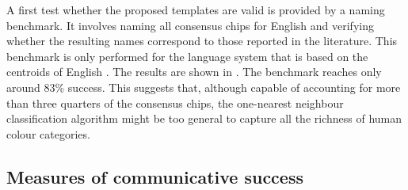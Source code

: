 A first test whether the proposed templates are valid is provided by a
naming benchmark. It
involves naming all consensus chips for English
\citep{sturges95location} and verifying whether the resulting names
correspond to those reported in the literature. This benchmark is only
performed for the language system that is based on the centroids of
English \citep{sturges95location}. The results are shown in . The benchmark reaches only around 83\%
success.  This suggests that, although capable of accounting for more
than three quarters of the consensus chips, the one-nearest neighbour
classification algorithm might be too general to capture all the
richness of human colour categories.

\begin{table}[htbp]
  \centering
  \normalsize
  \caption[Naming benchmark for English basic colour categories]{Number of correctly
    named consensus samples broken down by category: white (\textsc{we}), grey
    (\textsc{gy}), black (\textsc{bk}), green (\textsc{gn}), yellow (\textsc{yw}), blue (\textsc{bl}), red (\textsc{rd}), purple (\textsc{pu}), brown (\textsc{br}), orange (\textsc{or}) and pink (\textsc{pk}). The total
    number of consensus chips is shown on top.}
  \label{t:bcs-naming-benchmark}
\end{table}

\subsection{Measures of communicative success}

